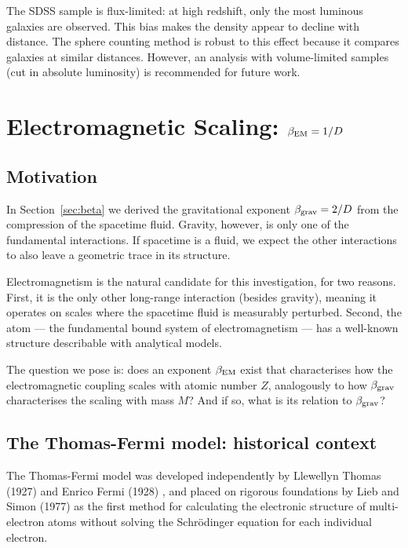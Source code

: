 \documentclass[10pt,a4paper]{article}
\begin{document}
The SDSS sample is flux-limited: at high redshift, only the most luminous galaxies are observed. This bias makes the density appear to decline with distance. The sphere counting method is robust to this effect because it compares galaxies at similar distances. However, an analysis with volume-limited samples (cut in absolute luminosity) is recommended for future work.


\section{Electromagnetic Scaling: $\beta_{\rm EM} = 1/D$}\label{sec:em}

\subsection{Motivation}

In Section~\ref{sec:beta} we derived the gravitational exponent $\beta_{\rm grav} = 2/D$ from the compression of the spacetime fluid. Gravity, however, is only one of the fundamental interactions. If spacetime is a fluid, we expect the other interactions to also leave a geometric trace in its structure.

Electromagnetism is the natural candidate for this investigation, for two reasons. First, it is the only other long-range interaction (besides gravity), meaning it operates on scales where the spacetime fluid is measurably perturbed. Second, the atom --- the fundamental bound system of electromagnetism --- has a well-known structure describable with analytical models.

The question we pose is: does an exponent $\beta_{\rm EM}$ exist that characterises how the electromagnetic coupling scales with atomic number $Z$, analogously to how $\beta_{\rm grav}$ characterises the scaling with mass $M$? And if so, what is its relation to $\beta_{\rm grav}$?

\subsection{The Thomas-Fermi model: historical context}

The Thomas-Fermi model was developed independently by Llewellyn Thomas (1927) \cite{Thomas1927} and Enrico Fermi (1928) \cite{Fermi1928}, and placed on rigorous foundations by Lieb and Simon (1977) \cite{LiebSimon1977} as the first method for calculating the electronic structure of multi-electron atoms without solving the Schr\"odinger equation for each individual electron.
\end{document}
